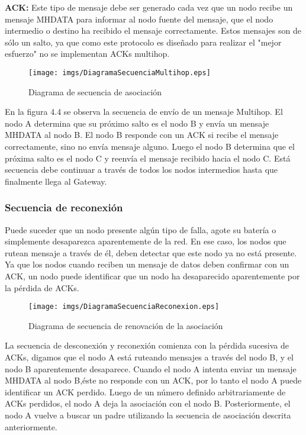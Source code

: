\textbf{ACK:} Este tipo de mensaje debe ser generado cada vez que un nodo recibe un mensaje MH\textunderscore DATA para informar al nodo fuente del mensaje, que el nodo intermedio o destino ha recibido el mensaje correctamente. Estos mensajes son de sólo un salto, ya que como este protocolo es diseñado para realizar el "mejor esfuerzo" no se implementan ACKs multihop.\\

\begin{figure}[H]
 \centering
 \texttt{[image: imgs/DiagramaSecuenciaMultihop.eps]}
 \caption{Diagrama de secuencia de asociación}
\end{figure}

En la figura 4.4 se observa la secuencia de envío de un mensaje Multihop. El nodo A determina que su próximo salto es el nodo B y envía un mensaje MH\textunderscore DATA al nodo B. El nodo B responde con un ACK si recibe el mensaje correctamente, sino no envía mensaje alguno.  Luego el nodo B determina que el próxima salto es el nodo C y reenvía el mensaje recibido hacia el nodo C. Está secuencia debe continuar a través de todos los nodos intermedios hasta que finalmente llega al Gateway.

\subsubsection{Secuencia de reconexión}
Puede suceder que un nodo presente algún tipo de falla, agote su batería o simplemente desaparezca aparentemente de la red. En ese caso, los nodos que rutean mensaje a través de él, deben detectar que este nodo ya no está presente. Ya que los nodos cuando reciben un mensaje de datos deben confirmar con un ACK, un nodo puede identificar que un nodo ha desaparecido aparentemente por la pérdida de ACKs.\\

\begin{figure}[H]
 \centering
 \texttt{[image: imgs/DiagramaSecuenciaReconexion.eps]}
 \caption{Diagrama de secuencia de renovación de la asociación}
\end{figure}

La secuencia de desconexión y reconexión comienza con la pérdida sucesiva de ACKs, digamos que el nodo A está ruteando mensajes a través del nodo B, y el nodo B aparentemente desaparece. Cuando el nodo A intenta enviar un mensaje MH\textunderscore DATA al nodo B,éste no responde con un ACK, por lo tanto el nodo A puede identificar un ACK perdido. Luego de un número definido arbitrariamente de ACKs perdidos, el nodo A deja la asociación con el nodo B. Posteriormente, el nodo A vuelve a buscar un padre utilizando la secuencia de asociación descrita anteriormente.

